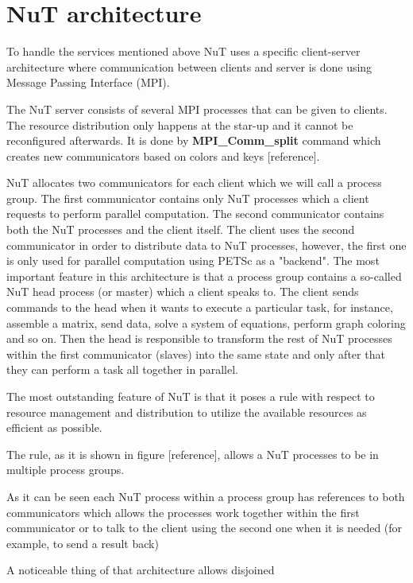 \section{NuT architecture}
To handle the services mentioned above NuT uses a specific client-server architecture where communication between clients and server is done using Message Passing Interface (MPI).\par


The NuT server consists of several MPI processes that can be given to clients. The resource distribution only happens at the star-up and it cannot be reconfigured afterwards. It is done by \textbf{MPI\_Comm\_split} command which creates new communicators based on colors and keys [reference].

NuT allocates two communicators for each client which we will call a process group. The first communicator contains only NuT processes which a client requests to perform parallel computation. The second communicator contains both the NuT processes and the client itself. The client uses the second communicator in order to distribute data to NuT processes, however, the first one is only used for parallel computation using PETSc as a "backend". The most important feature in this architecture is that a process group contains a so-called NuT head process (or master) which a client speaks to. The client sends commands to the head when it wants to execute a particular task, for instance, assemble a matrix, send data, solve a system of equations, perform graph coloring and so on. Then the head is responsible to transform the rest of NuT processes within the first communicator (slaves) into the same state and only after that they can perform a task all together in parallel.\par

The most outstanding feature of NuT is that it poses a rule with respect to resource management and distribution to utilize the available resources as efficient as possible. \par
The rule, as it is shown in figure [reference], allows a NuT processes to be in multiple process groups. 




As it can be seen each NuT process within a process group has references to both communicators which allows the processes work together within the first communicator or to talk to the client using the second one when it is needed (for example, to send a result back) \par
A noticeable thing of that architecture allows disjoined 





